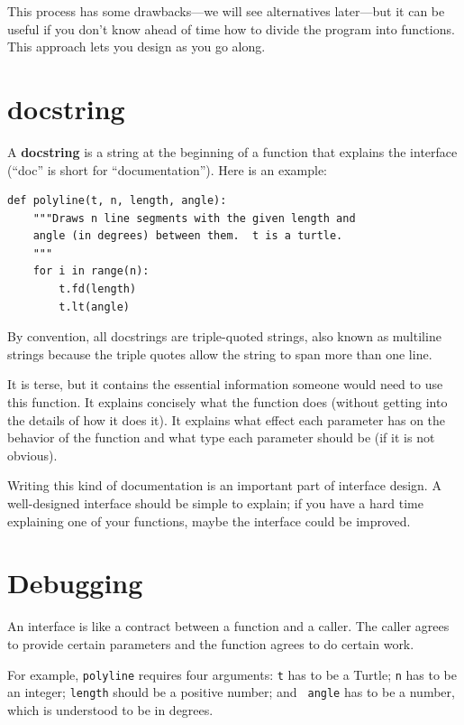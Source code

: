 \documentclass[10pt]{book}
\begin{document}
This process has some drawbacks---we will see alternatives later---but
it can be useful if you don't know ahead of time how to divide the
program into functions.  This approach lets you design as you go
along.


\section{docstring}
\label{docstring}

A {\bf docstring} is a string at the beginning of a function that
explains the interface (``doc'' is short for ``documentation'').  Here
is an example:

\begin{verbatim}
def polyline(t, n, length, angle):
    """Draws n line segments with the given length and
    angle (in degrees) between them.  t is a turtle.
    """    
    for i in range(n):
        t.fd(length)
        t.lt(angle)
\end{verbatim}
%
By convention, all docstrings are triple-quoted strings, also known
as multiline strings because the triple quotes allow the string
to span more than one line.

It is terse, but it contains the essential information
someone would need to use this function.  It explains concisely what
the function does (without getting into the details of how it does
it).  It explains what effect each parameter has on the behavior of
the function and what type each parameter should be (if it is not
obvious).

Writing this kind of documentation is an important part of interface
design.  A well-designed interface should be simple to explain;
if you have a hard time explaining one of your functions,
maybe the interface could be improved.


\section{Debugging}

An interface is like a contract between a function and a caller.
The caller agrees to provide certain parameters and the function
agrees to do certain work.

For example, {\tt polyline} requires four arguments: {\tt t} has to be
a Turtle; {\tt n} has to be an
integer; {\tt length} should be a positive number; and {\tt
  angle} has to be a number, which is understood to be in degrees.
\end{document}
